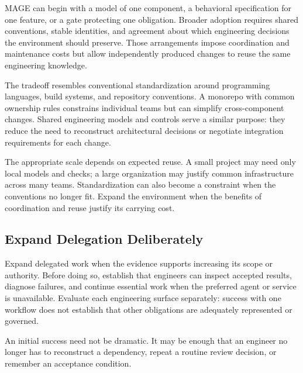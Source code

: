 MAGE can begin with a model of one component, a behavioral specification for one feature, or a gate protecting one obligation. Broader adoption requires shared conventions, stable identities, and agreement about which engineering decisions the environment should preserve. Those arrangements impose coordination and maintenance costs but allow independently produced changes to reuse the same engineering knowledge.

The tradeoff resembles conventional standardization around programming languages, build systems, and repository conventions. A monorepo with common ownership rules constrains individual teams but can simplify cross-component changes. Shared engineering models and controls serve a similar purpose: they reduce the need to reconstruct architectural decisions or negotiate integration requirements for each change.

The appropriate scale depends on expected reuse. A small project may need only local models and checks; a large organization may justify common infrastructure across many teams. Standardization can also become a constraint when the conventions no longer fit. Expand the environment when the benefits of coordination and reuse justify its carrying cost.

\subsection{Expand Delegation Deliberately}\label{heading:decide-whether-to-expand}

Expand delegated work when the evidence supports increasing its scope or authority. Before doing so, establish that engineers can inspect accepted results, diagnose failures, and continue essential work when the preferred agent or service is unavailable. Evaluate each engineering surface separately: success with one workflow does not establish that other obligations are adequately represented or governed.

An initial success need not be dramatic. It may be enough that an engineer no longer has to reconstruct a dependency, repeat a routine review decision, or remember an acceptance condition.
